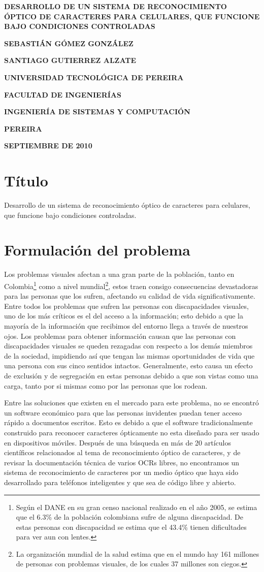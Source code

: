 \documentclass[a4paper, 11pt, oneside]{article}
\newcommand\portada{
	\begin{titlepage}
		\begin{center}
			{\large \bf DESARROLLO DE UN SISTEMA DE RECONOCIMIENTO ÓPTICO DE CARACTERES PARA CELULARES, QUE FUNCIONE BAJO CONDICIONES CONTROLADAS }
			\vfill
			{\large\bf SEBASTIÁN GÓMEZ GONZÁLEZ \par}
			{\large\bf SANTIAGO GUTIERREZ ALZATE \par}
			\vfill
			{\large\bf UNIVERSIDAD TECNOLÓGICA DE PEREIRA  \par}
			{\large\bf FACULTAD DE INGENIERÍAS \par}
			{\large\bf INGENIERÍA DE SISTEMAS Y COMPUTACIÓN \par}
			{\large\bf PEREIRA\par}
			{\large\bf SEPTIEMBRE DE 2010 \par}
		\end{center}
	\end{titlepage}
}
\begin{document}
\portada

	\clearpage
	\section{Título}
	Desarrollo de un sistema de reconocimiento óptico de caracteres para celulares, que funcione bajo condiciones controladas.
	
	\section{Formulación del problema}
	Los problemas visuales afectan a una gran parte de la población, tanto en Colombia\footnote{Según el DANE en su gran censo nacional realizado en el año 2005, se estima que el 6.3\% de la población colombiana sufre de alguna discapacidad. De estas personas con discapacidad se estima que el 43.4\% tienen dificultades para ver aun con lentes.} como a nivel mundial\footnote{La organización mundial de la salud estima que en el mundo hay 161 millones de personas con problemas visuales, de los cuales 37 millones son ciegos.}, estos traen consigo consecuencias devastadoras para las personas que los sufren, afectando su calidad de vida significativamente. Entre todos los problemas que sufren las personas con discapacidades visuales, uno de los más críticos es el del acceso a la información; esto debido a que la mayoría de la información que recibimos del entorno llega a través de nuestros ojos. Los problemas para obtener información causan que las personas con discapacidades visuales se queden rezagadas con respecto a los demás miembros de la sociedad, impidiendo así que tengan las mismas oportunidades de vida que una persona con sus cinco sentidos intactos. Generalmente, esto causa un efecto de exclusión y de segregación en estas personas debido a que son vistas como una carga, tanto por si mismas como por las personas que los rodean. 
	
	Entre las soluciones que existen en el mercado para este problema, no se encontró un software económico para que las personas invidentes puedan tener acceso rápido a documentos escritos. Esto es debido a que el software tradicionalmente construido para reconocer caracteres ópticamente no esta diseñado para ser usado en dispositivos móviles. Después de una búsqueda en más de 20 artículos científicos relacionados al tema de reconocimiento óptico de caracteres, y de revisar la documentación técnica de varios OCRs libres, no encontramos un sistema de reconocimiento de caracteres por un medio óptico que haya sido desarrollado para teléfonos inteligentes y que sea de código libre y abierto.
\end{document}
